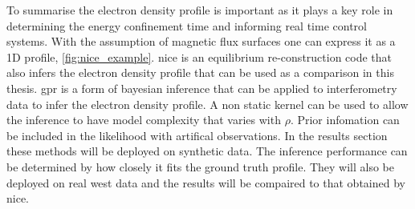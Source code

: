 To summarise the electron density profile is important as it plays a key role in determining the energy confinement time and informing real time control systems. With the assumption of magnetic flux surfaces one can express it as a 1D profile, \ref{fig:nice_example}. \gls{nice} is an equilibrium re-construction code that also infers the electron density profile that can be used as a comparison in this thesis. \gls{gpr} is a form of bayesian inference that can be applied to interferometry data to infer the electron density profile. A non static kernel can be used to allow the inference to have model complexity that varies with $\rho$. Prior infomation can be included in the likelihood with artifical observations. In the results section these methods will be deployed on synthetic data. The inference performance can be determined by how closely it fits the ground truth profile. They will also be deployed on real \gls{west} data and the results will be compaired to that obtained by \gls{nice}.


